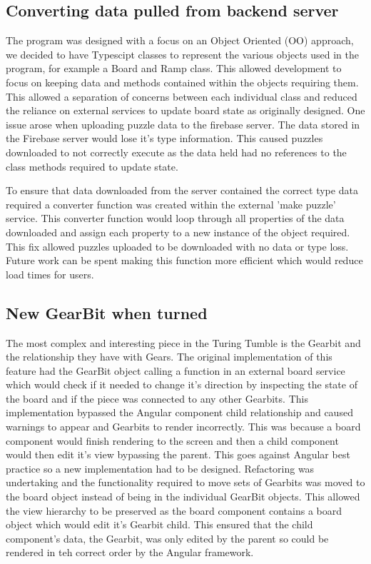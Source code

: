\documentclass{l4proj}
\begin{document}
\subsection{Converting data pulled from backend server}

The program was designed with a focus on an Object Oriented (OO) approach, we decided to have Typescipt classes to represent the various objects used in the program, for example a Board and Ramp class. This allowed development to focus on keeping data and methods contained within the objects requiring them. This allowed a separation of concerns between each individual class and reduced the reliance on external services to update board state as originally designed. One issue arose when uploading puzzle data to the firebase server. The data stored in the Firebase server would lose it's type information. This caused puzzles downloaded to not correctly execute as the data held had no references to the class methods required to update state. 

To ensure that data downloaded from the server contained the correct type data required a converter function was created within the external 'make puzzle' service. This converter function would loop through all properties of the data downloaded and assign each property to a new instance of the object required. This fix allowed puzzles uploaded to be downloaded with no data or type loss. Future work can be spent making this function more efficient which would reduce load times for users.

\subsection{New GearBit when turned}
The most complex and interesting piece in the Turing Tumble is the Gearbit and the relationship they have with Gears. The original implementation of this feature had the GearBit object calling a function in an external board service which would check if it needed to change it's direction by inspecting the state of the board and if the piece was connected to any other Gearbits. This implementation bypassed the Angular component child relationship and caused warnings to appear and Gearbits to render incorrectly. This was because a board component would finish rendering to the screen and then a child component would then edit it's view bypassing the parent. This goes against Angular best practice so a new implementation had to be designed. Refactoring was undertaking and the functionality required to move sets of Gearbits was moved to the board object instead of being in the individual GearBit objects. This allowed the view hierarchy to be preserved as the board component contains a board object which would edit it's Gearbit child. This ensured that the child component's data, the Gearbit, was only edited by the parent so could be rendered in teh correct order by the Angular framework. 
\end{document}
